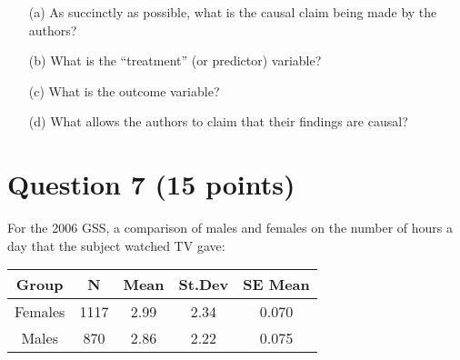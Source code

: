\documentclass[12pt,letterpaper]{article}
\begin{document}
\begin{itemize}
	
	\item[(a)]  As succinctly as possible, what is the causal claim being made by the authors? \\
	
	\vspace{2.5cm}
	
	
	\item[(b)]  What is the ``treatment'' (or predictor) variable? \\
	
	\vspace{2.5cm}
	
	
	\item[(c)]  What is the outcome variable? \\
	
	\vspace{2.5cm}
	
	
	\item[(d)]  What allows the authors to claim that their findings are causal? \\

	
\end{itemize}

		\vspace{7em}
\section*{Question 7 (15 points)}

For the 2006 GSS, a comparison of males and females on the number of hours a day that the subject watched TV gave:
\begin{table}[H]
	\centering
	\begin{tabular}{c|cccc}
		Group  & N & Mean & St.Dev & SE Mean \\ 
		\hline \rule[-2ex]{0pt}{5.5ex}
		Females & 1117  & 2.99 & 2.34 & 0.070  \\ 
		Males &  870 & 2.86 & 2.22 & 0.075 \\ 
		\hline 
	\end{tabular} 
\end{table}
\end{document}
